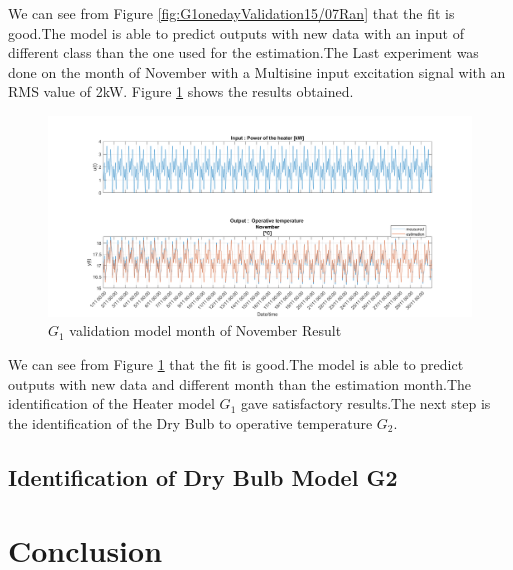 \documentclass[a4paper,12pt]{article}
\numberwithin{equation}{section}
\begin{document}
\noindent
We can see from Figure \ref{fig:G1onedayValidation15/07Ran} that the fit is good.The model is able to predict outputs with new data with an input of different class than the one used for the estimation.The Last experiment was  done on the month of November with a Multisine input excitation signal with an RMS value of 2kW. Figure \ref{fig:G1onedayValidationNov} shows the results obtained.

\begin{figure}[H]
    \includegraphics[width=\textwidth]{G1_val_NOV.png}
    \centering
    \caption{$G_{1}$ validation model month of November  Result}
    \label{fig:G1onedayValidationNov}
\end{figure}

\noindent
We can see from Figure \ref{fig:G1onedayValidationNov} that the fit is good.The model is able to predict outputs with new data and different month than the estimation month.The identification of the Heater model $G_{1}$ gave satisfactory results.The next step is the identification of the Dry Bulb to operative temperature $G_{2}$.

\subsection{Identification of Dry Bulb Model G2 }


\newpage
\section{Conclusion}
\end{document}
